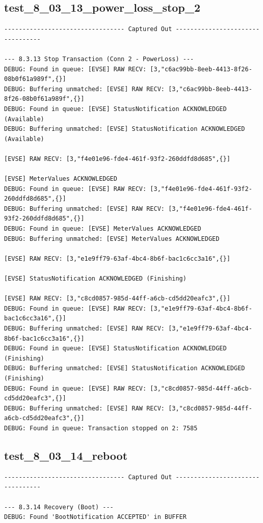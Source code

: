 \documentclass{article}
\begin{document}
\subsection*{test\_8\_03\_13\_power\_loss\_stop\_2}
\begin{lstlisting}
--------------------------------- Captured Out ---------------------------------

--- 8.3.13 Stop Transaction (Conn 2 - PowerLoss) ---
DEBUG: Found in queue: [EVSE] RAW RECV: [3,"c6ac99bb-8eeb-4413-8f26-08b0f61a989f",{}]
DEBUG: Buffering unmatched: [EVSE] RAW RECV: [3,"c6ac99bb-8eeb-4413-8f26-08b0f61a989f",{}]
DEBUG: Found in queue: [EVSE] StatusNotification ACKNOWLEDGED (Available)
DEBUG: Buffering unmatched: [EVSE] StatusNotification ACKNOWLEDGED (Available)

[EVSE] RAW RECV: [3,"f4e01e96-fde4-461f-93f2-260ddfd8d685",{}]

[EVSE] MeterValues ACKNOWLEDGED
DEBUG: Found in queue: [EVSE] RAW RECV: [3,"f4e01e96-fde4-461f-93f2-260ddfd8d685",{}]
DEBUG: Buffering unmatched: [EVSE] RAW RECV: [3,"f4e01e96-fde4-461f-93f2-260ddfd8d685",{}]
DEBUG: Found in queue: [EVSE] MeterValues ACKNOWLEDGED
DEBUG: Buffering unmatched: [EVSE] MeterValues ACKNOWLEDGED

[EVSE] RAW RECV: [3,"e1e9ff79-63af-4bc4-8b6f-bac1c6cc3a16",{}]

[EVSE] StatusNotification ACKNOWLEDGED (Finishing)

[EVSE] RAW RECV: [3,"c8cd0857-985d-44ff-a6cb-cd5dd20eafc3",{}]
DEBUG: Found in queue: [EVSE] RAW RECV: [3,"e1e9ff79-63af-4bc4-8b6f-bac1c6cc3a16",{}]
DEBUG: Buffering unmatched: [EVSE] RAW RECV: [3,"e1e9ff79-63af-4bc4-8b6f-bac1c6cc3a16",{}]
DEBUG: Found in queue: [EVSE] StatusNotification ACKNOWLEDGED (Finishing)
DEBUG: Buffering unmatched: [EVSE] StatusNotification ACKNOWLEDGED (Finishing)
DEBUG: Found in queue: [EVSE] RAW RECV: [3,"c8cd0857-985d-44ff-a6cb-cd5dd20eafc3",{}]
DEBUG: Buffering unmatched: [EVSE] RAW RECV: [3,"c8cd0857-985d-44ff-a6cb-cd5dd20eafc3",{}]
DEBUG: Found in queue: Transaction stopped on 2: 7585
\end{lstlisting}
\subsection*{test\_8\_03\_14\_reboot}
\begin{lstlisting}
--------------------------------- Captured Out ---------------------------------

--- 8.3.14 Recovery (Boot) ---
DEBUG: Found 'BootNotification ACCEPTED' in BUFFER
\end{lstlisting}
\end{document}
